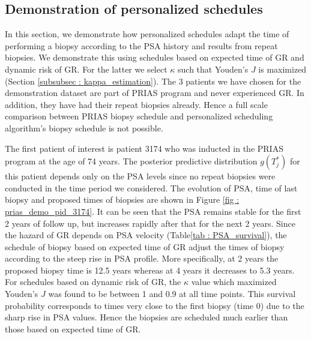 \subsection{Demonstration of personalized schedules}
\label{subsec : demo_prias_pers_schedule}
In this section, we demonstrate how personalized schedules adapt the time of performing a biopsy according to the PSA history and results from repeat biopsies. We demonstrate this using schedules based on expected time of GR and dynamic risk of GR. For the latter we select $\kappa$ such that Youden's $J$ is maximized (Section \ref{subsubsec : kappa_estimation}). The 3 patients we have chosen for the demonstration dataset are part of PRIAS program and never experienced GR. In addition, they have had their repeat biopsies already. Hence a full scale comparison between PRIAS biopsy schedule and personalized scheduling algorithm's biopsy schedule is not possible.

The first patient of interest is patient 3174 who was inducted in the PRIAS program at the age of 74 years. The posterior predictive distribution $g(T^*_j)$ for this patient depends only on the PSA levels since no repeat biopsies were conducted in the time period we considered. The evolution of PSA, time of last biopsy and proposed times of biopsies are shown in Figure \ref{fig : prias_demo_pid_3174}. It can be seen that the PSA remains stable for the first 2 years of follow up, but increases rapidly after that for the next 2 years. Since the hazard of GR depends on PSA velocity (Table\ref{tab : PSA_survival}), the schedule of biopsy based on expected time of GR adjust the times of biopsy according to the steep rise in PSA profile. More specifically, at 2 years the proposed biopsy time is 12.5 years whereas at 4 years it decreases to 5.3 years. For schedules based on dynamic risk of GR, the $\kappa$ value which maximized Youden's $J$ was found to be between 1 and 0.9 at all time points. This survival probability corresponds to times very close to the first biopsy (time 0) due to the sharp rise in PSA values. Hence the biopsies are scheduled much earlier than those based on expected time of GR.

